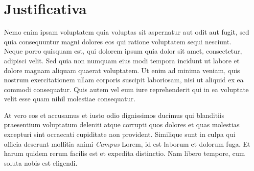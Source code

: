 \section{Justificativa}
\label{sec:justificativa}

Nemo enim ipsam voluptatem quia voluptas sit aspernatur aut odit aut 
fugit, sed quia consequuntur magni dolores eos qui ratione voluptatem 
sequi nesciunt. Neque porro quisquam est, qui dolorem ipsum quia dolor 
sit amet, consectetur, adipisci velit. Sed quia non 
numquam eius modi tempora incidunt ut labore et dolore magnam aliquam 
quaerat voluptatem. Ut enim ad minima veniam, quis nostrum exercitationem 
ullam corporis suscipit laboriosam, nisi ut aliquid ex ea commodi 
consequatur. Quis autem vel eum iure reprehenderit qui in ea voluptate 
velit esse quam nihil molestiae consequatur.

At vero eos et accusamus et iusto odio dignissimos ducimus qui blanditiis 
praesentium voluptatum deleniti atque corrupti quos dolores et quas 
molestias excepturi sint occaecati cupiditate non provident. Similique 
sunt in culpa qui officia deserunt mollitia animi \textit{Campus} Lorem, 
id est laborum et dolorum fuga. Et harum quidem rerum facilis est et 
expedita distinctio. Nam libero tempore, cum soluta nobis est eligendi.